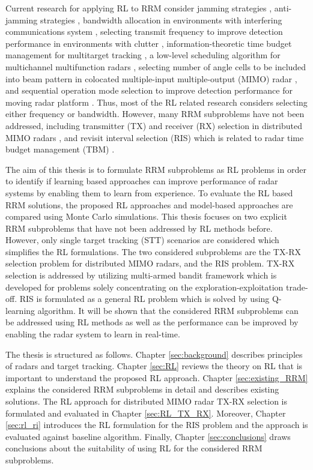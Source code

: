 \documentclass[english, 12pt, a4paper, elec, utf8, a-1b, online]{aaltothesis}
\begin{document}
Current research for applying RL to RRM consider
jamming strategies \cite{Qiang2017, Wang2019, Wang2019a, Zhang2019},
anti-jamming strategies \cite{Kang2018, Ak2019}, 
bandwidth allocation in environments with interfering communications system \cite{Selvi2018, Kozy2019},
selecting transmit frequency to improve detection performance in environments with clutter \cite{Wabeke2010}, 
information-theoretic time budget management for multitarget tracking \cite{Kreucher2005, Xu2010},
a low-level scheduling algorithm for multichannel multifunction radars \cite{Shaghaghi2018},
selecting number of angle cells to be included into beam pattern in colocated multiple-input multiple-output (MIMO) radar \cite{Wang2018}, 
and sequential operation mode selection to improve detection performance for moving radar platform \cite{Smits2008}.
Thus, most of the RL related research considers selecting  either frequency or bandwidth. 
However, many RRM subproblems have not been addressed, including transmitter (TX) and receiver (RX) selection in distributed MIMO radars \cite{Godrich2011a, Godrich2011, Sun2014}, and revisit interval selection (RIS) which is related to radar time budget management (TBM) \cite{Cohen1986, Gardner1988, Munu1992, ChengTing2007, Baek2010, Watson1993, Charlish2015, Keuk1975, Shin1995, Benoudnine2006, Esfahani2012, Zamani2017, Christiansen2018, Pilte2018}.

The aim of this thesis is to formulate RRM subproblems as RL problems in order to identify if learning based approaches can improve performance of radar systems by enabling them to learn from experience. 
To evaluate the RL based RRM solutions, the proposed RL approaches and model-based approaches are compared using Monte Carlo simulations. 
This thesis focuses on two explicit RRM subproblems that have not been addressed by RL methods before. 
However, only single target tracking (STT) scenarios are considered which simplifies the RL formulations. 
The two considered subproblems are the TX-RX selection problem for distributed MIMO radars, and the RIS problem.
TX-RX selection is addressed by utilizing multi-armed bandit framework which is developed for problems solely concentrating on the exploration-exploitation trade-off. 
RIS is formulated as a general RL problem which is solved by using Q-learning algorithm.
It will be shown that the considered RRM subproblems can be addressed using RL methods as well as the performance can be improved by enabling the radar system to learn in real-time.

The thesis is structured as follows. Chapter \ref{sec:background} describes principles of radars and target tracking. Chapter \ref{sec:RL} reviews the theory on RL that is important to understand the proposed RL approach. 
Chapter \ref{sec:existing_RRM} explains the considered RRM subproblems in detail and describes existing solutions.
The RL approach for distributed MIMO radar TX-RX selection is formulated and evaluated in Chapter \ref{sec:RL_TX_RX}. Moreover,  Chapter \ref{sec:rl_ri} introduces the RL formulation for the RIS problem and the approach is evaluated against baseline algorithm. 
Finally, Chapter \ref{sec:conclusions} draws conclusions about the suitability of using RL for the considered RRM subproblems. 
\end{document}
